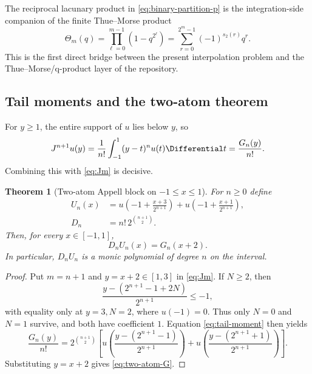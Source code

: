 \documentclass[11pt,oneside]{article}
\newtheorem{theorem}{Theorem}[section]
\theoremstyle{definition}
\theoremstyle{remark}
\begin{document}
The reciprocal lacunary product in \eqref{eq:binary-partition-p} is the
integration-side companion of the finite Thue--Morse product
\begin{equation}
 \Theta_m(q)=\prod_{\ell=0}^{m-1}(1-q^{2^\ell})
 =\sum_{r=0}^{2^m-1}(-1)^{s_2(r)}q^r.
 \label{eq:TM-product}
\end{equation}
This is the first direct bridge between the present interpolation problem
and the Thue--Morse/q-product layer of the repository.

\subsection{Tail moments and the two-atom theorem}
For $y\ge1$, the entire support of $u$ lies below $y$, so
\begin{equation}
 J^{n+1}u(y)
 =\frac1{n!}\int_{-1}^{1}(y-t)^n u(t)\Differential t
 =\frac{G_n(y)}{n!}.
 \label{eq:tail-moment}
\end{equation}
Combining this with \eqref{eq:Jm} is decisive.

\begin{theorem}[Two-atom Appell block on $-1\le x\le 1$]
\label{thm:two-atom}
For $n\ge0$ define
\begin{align}
 U_n(x)&=
 u\!\left(-1+\frac{x+3}{2^{n+1}}\right)
 +u\!\left(-1+\frac{x+1}{2^{n+1}}\right),
 \label{eq:Un-def}\\
 D_n&=n!\,2^{\binom{n+1}{2}}.
 \label{eq:Dn-def}
\end{align}
Then, for every $x\in[-1,1]$,
\begin{equation}
 \boxed{\qquad D_nU_n(x)=G_n(x+2).\qquad}
 \label{eq:two-atom-G}
\end{equation}
In particular, $D_nU_n$ is a monic polynomial of degree $n$ on the interval.
\end{theorem}

\begin{proof}
Put $m=n+1$ and $y=x+2\in[1,3]$ in \eqref{eq:Jm}.  If $N\ge2$, then
\[
 \frac{y-(2^{n+1}-1+2N)}{2^{n+1}}\le-1,
\]
with equality only at $y=3,N=2$, where $u(-1)=0$.  Thus only $N=0$ and
$N=1$ survive, and both have coefficient $1$.  Equation
\eqref{eq:tail-moment} then yields
\[
 \frac{G_n(y)}{n!}
 =2^{\binom{n+1}{2}}
 \left[
 u\!\left(\frac{y-(2^{n+1}-1)}{2^{n+1}}\right)
 +u\!\left(\frac{y-(2^{n+1}+1)}{2^{n+1}}\right)
 \right].
\]
Substituting $y=x+2$ gives \eqref{eq:two-atom-G}.
\end{proof}
\end{document}
